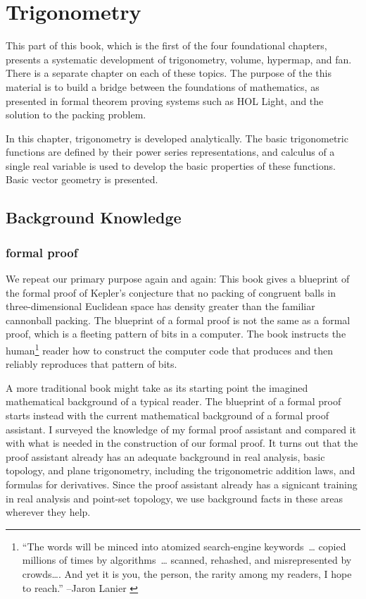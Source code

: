 \chapter{Trigonometry}
\label{part:trig}
%

\begin{summary}
  This part of this book, which is the first of the four foundational
  chapters, presents a systematic development of trigonometry, volume,
  hypermap, and fan.  There is a separate chapter on each of these
  topics.  The purpose of the this material is to build a bridge
  between the foundations of mathematics, as presented in formal
  theorem proving systems such as HOL Light, and the solution to the
  packing problem.  

  In this chapter, trigonometry is developed analytically.  The basic
  trigonometric functions are defined by their power series
  representations, and calculus of a single real variable is used to
  develop the basic properties of these functions.  Basic vector
  geometry is presented.
\end{summary}


\section{Background Knowledge}

\subsection{formal proof}

We repeat our primary purpose again and again: This book gives a
blueprint of the formal proof of Kepler's conjecture that no packing of
congruent balls in three-dimensional Euclidean space has density
greater than the familiar cannonball packing.  The blueprint of a
formal proof is not the same as a formal proof, which is a 
fleeting pattern of bits in a computer.  The book instructs the
human\footnote{``The words will be minced into atomized search-engine
  keywords~\dots{} copied millions of times by algorithms~\dots{}
  scanned, rehashed, and misrepresented by crowds\dots.  And yet
  it is you, the person, the rarity among my readers, I hope to
  reach.'' --Jaron Lanier \cite{Lanier}} reader how to construct the
computer code that  produces and then reliably reproduces that
pattern of bits.

A more traditional book might take as its starting point the imagined
mathematical background of a typical reader.  The blueprint of a
formal proof starts instead with the current mathematical background
of a formal proof assistant.  I surveyed the knowledge of my formal
proof assistant and compared it with what is needed in the
construction of our formal proof.  It turns out that the proof
assistant already has an adequate background in real analysis, basic
topology, and plane trigonometry, including the trigonometric addition
laws, and formulas for derivatives.  Since the proof assistant already
has a signicant training in real analysis and point-set topology, we
 use background facts in these areas wherever they help.


